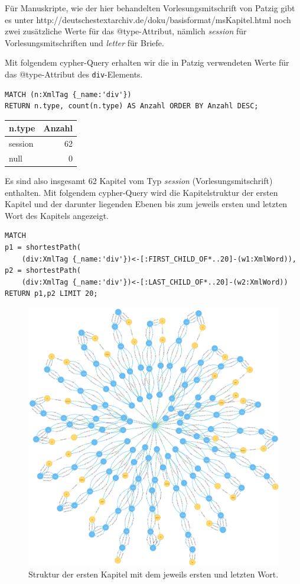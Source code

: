 \documentclass[12pt,ngerman,]{article}
\begin{document}
Für Manuskripte, wie der hier behandelten Vorlesungsmitschrift von
Patzig gibt es unter
http://deutschestextarchiv.de/doku/basisformat/msKapitel.html noch zwei
zusätzliche Werte für das @type-Attribut, nämlich \emph{session} für
Vorlesungsmitschriften und \emph{letter} für Briefe.

Mit folgendem cypher-Query erhalten wir die in Patzig verwendeten Werte
für das @type-Attribut des \texttt{div}-Elements.

\begin{verbatim}
MATCH (n:XmlTag {_name:'div'})
RETURN n.type, count(n.type) AS Anzahl ORDER BY Anzahl DESC;
\end{verbatim}

\begin{longtable}[]{@{}lr@{}}
\toprule
n.type & Anzahl\tabularnewline
\midrule
\endhead
session & 62\tabularnewline
null & 0\tabularnewline
\bottomrule
\end{longtable}

Es sind also insgesamt 62 Kapitel vom Typ \emph{session}
(Vorlesungsmitschrift) enthalten. Mit folgendem cypher-Query wird die
Kapitelstruktur der ersten Kapitel und der darunter liegenden Ebenen bis
zum jeweils ersten und letzten Wort des Kapitels angezeigt.

\begin{verbatim}
MATCH
p1 = shortestPath(
    (div:XmlTag {_name:'div'})<-[:FIRST_CHILD_OF*..20]-(w1:XmlWord)),
p2 = shortestPath(
    (div:XmlTag {_name:'div'})<-[:LAST_CHILD_OF*..20]-(w2:XmlWord))
RETURN p1,p2 LIMIT 20;
\end{verbatim}

\begin{figure}
\centering
\includegraphics{Bilder/TEI2Graph/div-Struktur-XmlWord.png}
\caption{Struktur der ersten Kapitel mit dem jeweils ersten und letzten
Wort.}
\end{figure}
\end{document}

